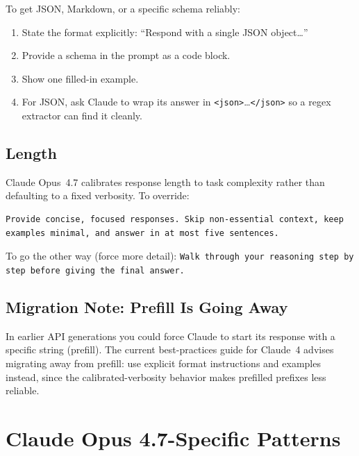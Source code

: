 To get JSON, Markdown, or a specific schema reliably:

\begin{enumerate}
  \item State the format explicitly: ``Respond with a single JSON
        object\dots''
  \item Provide a schema in the prompt as a code block.
  \item Show one filled-in example.
  \item For JSON, ask Claude to wrap its answer in
        \texttt{<json>}\dots\texttt{</json>} so a regex extractor can
        find it cleanly.
\end{enumerate}

\subsection{Length}

Claude Opus~4.7 calibrates response length to task complexity rather than
defaulting to a fixed verbosity. To override:

\begin{lstlisting}[caption={Capping response length}]
Provide concise, focused responses. Skip non-essential context, keep
examples minimal, and answer in at most five sentences.
\end{lstlisting}

To go the other way (force more detail):
\texttt{Walk through your reasoning step by step before giving the
final answer.}

\subsection{Migration Note: Prefill Is Going Away}


In earlier API generations you could force Claude to start its response
with a specific string (prefill). The current best-practices guide for
Claude~4 advises migrating away from prefill: use explicit format
instructions and examples instead, since the calibrated-verbosity
behavior makes prefilled prefixes less reliable.

\section{Claude Opus 4.7-Specific Patterns}
\label{sec:opus-47-prompting}


